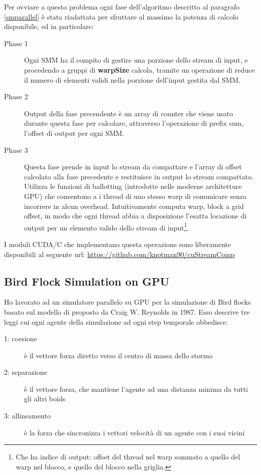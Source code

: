Per ovviare a questo problema ogni fase dell'algoritmo descritto al paragrafo
\ref{smparallel} è stata riadattata per sfruttare al massimo la potenza di
calcolo disponibile, ed in particolare:
\begin{description}
	\item[Phase 1]
	Ogni SMM ha il compito di gestire una porzione dello stream di input, e
	procedendo a gruppi di \textbf{warpSize} calcola, tramite un operazione di
	reduce il numero di elementi validi nella
	porzione dell'input gestita dal SMM.
	\item[Phase 2]
	Output della fase precendente è un array di counter che viene usato durante
	questa fase per calcolare, attraverso l'operazione di prefix sum, l'offset
	di output per ogni SMM.
	\item[Phase 3]
	Questa fase prende in input lo stream da compattare e l'array di offset
	calcolato alla fase precedente e restituisce in output lo stream compattato.
	Utilizza le funzioni di ballotting (introdotte nelle moderne architetture
	GPU) che consentono a i thread di uno stesso warp di comunicare senza
	incorrere in alcun overhead. Intuitivamente computa warp, block a grid
	offset, in modo che ogni thread abbia a disposizione l'esatta locazione di
	output per un elemento valido dello stream di input\footnote{Che ha indice
		di output: offset del thread nel warp sommato a quello del warp nel blocco,
		e quello del blocco nella griglia.}.
\end{description}
I moduli CUDA/C che implementano questa operazione sono liberamente
disponibili al seguente url: \url{https://github.com/knotman90/cuStreamComp}


\subsection{Bird Flock Simulation on GPU}
Ho lavorato ad un simulatore parallelo su GPU per la simulazione di Bird
flocks basato sul modello di proposto da Craig W. Reynolds in 1987. Esso
descrive tre leggi cui ogni agente della simulazione ad ogni step
temporale obbedisce:
\begin{description}
	\item[1: coesione] è il vettore forza diretto verso il centro di massa dello
	stormo 
	\item [2: separazione]  è il vettore forza, che mantiene l'agente ad una
	distanza minima da tutti gli altri boids
	\item [3: allineamento] è la forza che sincronizza i vettori velocità di un
	agente con i suoi vicini
\end{description}

